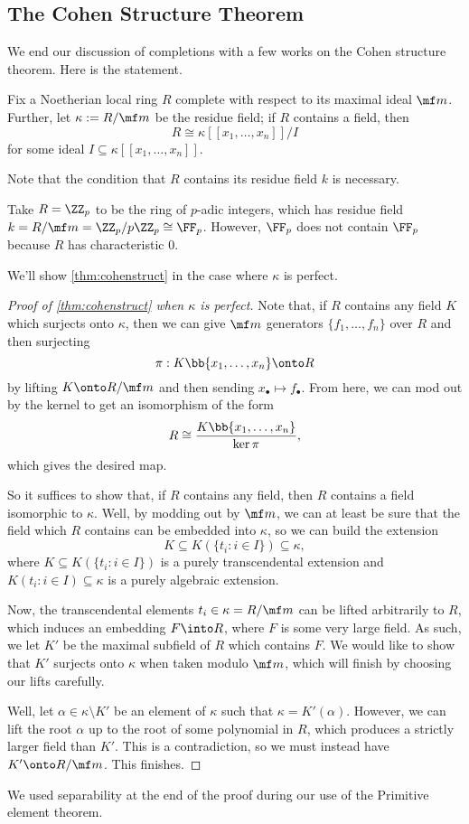 \subsection{The Cohen Structure Theorem}
We end our discussion of completions with a few works on the Cohen structure theorem. Here is the statement.
\begin{theorem} \label{thm:cohenstruct}
	Fix a Noetherian local ring $R$ complete with respect to its maximal ideal $\mf m$. Further, let $\kappa:=R/\mf m$ be the residue field; if $R$ contains a field, then
	\[R\cong\kappa[[x_1,\ldots,x_n]]/I\]
	for some ideal $I\subseteq\kappa[[x_1,\ldots,x_n]]$.
\end{theorem}
Note that the condition that $R$ contains its residue field $k$ is necessary.
\begin{nex}
	Take $R=\ZZ_p$ to be the ring of $p$-adic integers, which has residue field $k=R/\mf m=\ZZ_p/p\ZZ_p\cong\FF_p$. However, $\FF_p$ does not contain $\FF_p$ because $R$ has characteristic $0$.
\end{nex}
We'll show \autoref{thm:cohenstruct} in the case where $\kappa$ is perfect.
\begin{proof}[Proof of \autoref{thm:cohenstruct} when $\kappa$ is perfect]
	Note that, if $R$ contains any field $K$ which surjects onto $\kappa$, then we can give $\mf m$ generators $\{f_1,\ldots,f_n\}$ over $R$ and then surjecting
	\[\pi:K\bb{x_1,\ldots,x_n}\onto R\]
	by lifting $K\onto R/\mf m$ and then sending $x_\bullet\mapsto f_\bullet$. %
	From here, we can mod out by the kernel to get an isomorphism of the form
	\[R\cong\frac{K\bb{x_1,\ldots,x_n}}{\ker\pi},\]
	which gives the desired map.

	So it suffices to show that, if $R$ contains any field, then $R$ contains a field isomorphic to $\kappa$. Well, by modding out by $\mf m$, we can at least be sure that the field which $R$ contains can be embedded into $\kappa$, so we can build the extension
	\[K\subseteq K(\{t_i:i\in I\})\subseteq\kappa,\]
	where $K\subseteq K(\{t_i:i\in I\})$ is a purely transcendental extension and $K(t_i:i\in I)\subseteq\kappa$ is a purely algebraic extension.

	Now, the transcendental elements $t_i\in\kappa=R/\mf m$ can be lifted arbitrarily to $R$, which induces an embedding $F\into R$, where $F$ is some very large field. As such, we let $K'$ be the maximal subfield of $R$ which contains $F$. We would like to show that $K'$ surjects onto $\kappa$ when taken modulo $\mf m$, which will finish by choosing our lifts carefully.

	Well, let $\alpha\in\kappa\setminus K'$ be an element of $\kappa$ such that $\kappa=K'(\alpha)$. However, we can lift the root $\alpha$ up to the root of some polynomial in $R$, which produces a strictly larger field than $K'$. This is a contradiction, so we must instead have $K'\onto R/\mf m$. This finishes.
\end{proof}
\begin{remark}
	We used separability at the end of the proof during our use of the Primitive element theorem.
\end{remark}